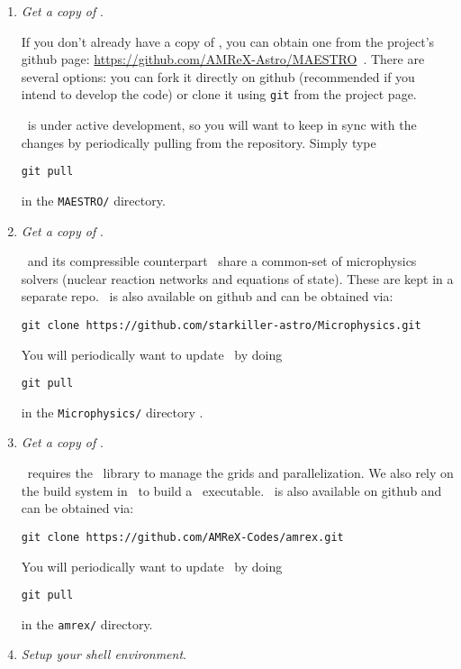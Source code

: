 \begin{enumerate}

\item {\em Get a copy of \maestro}.

  If you don't already have a copy of \maestro, you can obtain one
  from the project's {\sf github} page:
  \url{https://github.com/AMReX-Astro/MAESTRO}\, .  There are several
  options: you can fork it directly on {\sf github} (recommended if
  you intend to develop the code) or clone it using {\tt git} from the
  project page.

  \maestro\ is under active development, so you will want to keep in
  sync with the changes by periodically pulling from the repository.
  Simply type
  \begin{verbatim}
git pull
  \end{verbatim}
  in the {\tt MAESTRO/} directory.

\item {\em Get a copy of \microphysics}.

  \maestro\ and its compressible counterpart \castro\ share a
  common-set of microphysics solvers (nuclear reaction networks and
  equations of state).  These are kept in a separate repo.
  \microphysics\ is also available on github and can be obtained 
  via:
  \begin{verbatim}
git clone https://github.com/starkiller-astro/Microphysics.git
  \end{verbatim}

  You will periodically want to update \microphysics\ by doing
  \begin{verbatim}
git pull
  \end{verbatim}
  in the {\tt Microphysics/} directory
.
\item {\em Get a copy of \amrex}.

  \maestro\ requires the \amrex\ library to manage the grids and
  parallelization.  We also rely on the build system in \amrex\ to
  build a \maestro\ executable.  \amrex\ is also available on github
  and can be obtained via:
  \begin{verbatim}
git clone https://github.com/AMReX-Codes/amrex.git
  \end{verbatim}

  You will periodically want to update \amrex\ by doing
  \begin{verbatim}
git pull
  \end{verbatim}
  in the {\tt amrex/} directory.


\item {\em Setup your shell environment}.


\end{enumerate}
